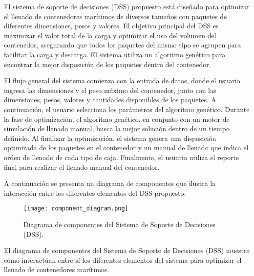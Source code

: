 \documentclass[9pt,a4paper]{rho}
\begin{document}
El sistema de soporte de decisiones (DSS) propuesto está diseñado para optimizar el llenado de contenedores marítimos de diversos tamaños con paquetes de diferentes dimensiones, pesos y valores. El objetivo principal del DSS es maximizar el valor total de la carga y optimizar el uso del volumen del contenedor, asegurando que todos los paquetes del mismo tipo se agrupen para facilitar la carga y descarga. El sistema utiliza un algoritmo genético \cite{bortfeldt2001hybrid} para encontrar la mejor disposición de los paquetes dentro del contenedor.

El flujo general del sistema comienza con la entrada de datos, donde el usuario ingresa las dimensiones y el peso máximo del contenedor, junto con las dimensiones, pesos, valores y cantidades disponibles de los paquetes. A continuación, el usuario selecciona los parámetros del algoritmo genético. Durante la fase de optimización, el algoritmo genético, en conjunto con un motor de simulación de llenado manual, busca la mejor solución dentro de un tiempo definido. Al finalizar la optimización, el sistema genera una disposición optimizada de los paquetes en el contenedor y un manual de llenado que indica el orden de llenado de cada tipo de caja. Finalmente, el usuario utiliza el reporte final para realizar el llenado manual del contenedor.

A continuación se presenta un diagrama de componentes que ilustra la interacción entre los diferentes elementos del DSS propuesto:

\begin{figure}[h!]
    \centering
    \texttt{[image: component\_diagram.png]}
    \caption{Diagrama de componentes del Sistema de Soporte de Decisiones (DSS).}
    \label{fig:component_diagram}
\end{figure}

El diagrama de componentes del Sistema de Soporte de Decisiones (DSS) muestra cómo interactúan entre sí los diferentes elementos del sistema para optimizar el llenado de contenedores marítimos.
\end{document}
